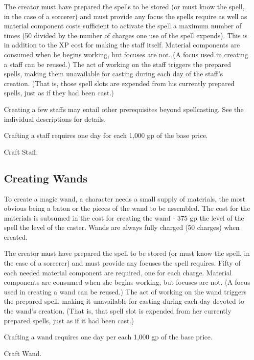 The creator must have prepared the spells to be stored (or must know the spell, in the case of a sorcerer) and must provide any focus the spells require as well as material component costs sufficient to activate the spell a maximum number of times (50 divided by the number of charges one use of the spell expends). This is in addition to the XP cost for making the staff itself. Material components are consumed when he begins working, but focuses are not. (A focus used in creating a staff can be reused.) The act of working on the staff triggers the prepared spells, making them unavailable for casting during each day of the staff's creation. (That is, those spell slots are expended from his currently prepared spells, just as if they had been cast.)

Creating a few staffs may entail other prerequisites beyond spellcasting. See the individual descriptions for details.

Crafting a staff requires one day for each 1,000 gp of the base price.

 Craft Staff.

\subsection{Creating Wands}

To create a magic wand, a character needs a small supply of materials, the most obvious being a baton or the pieces of the wand to be assembled. The cost for the materials is subsumed in the cost for creating the wand - 375 gp \mtimes the level of the spell \mtimes the level of the caster. Wands are always fully charged (50 charges) when created.

The creator must have prepared the spell to be stored (or must know the spell, in the case of a sorcerer) and must provide any focuses the spell requires. Fifty of each needed material component are required, one for each charge. Material components are consumed when she begins working, but focuses are not. (A focus used in creating a wand can be reused.) The act of working on the wand triggers the prepared spell, making it unavailable for casting during each day devoted to the wand's creation. (That is, that spell slot is expended from her currently prepared spells, just as if it had been cast.)

Crafting a wand requires one day per each 1,000 gp of the base price.

 Craft Wand.

